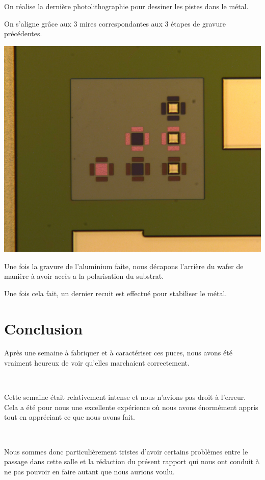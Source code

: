 \documentclass{article}
\begin{document}
On réalise la dernière photolithographie pour dessiner les pistes dans le métal.

On s’aligne grâce aux 3 mires correspondantes aux 3 étapes de gravure précédentes.

\includegraphics[width=\linewidth]{mire_alu_grave.png}

Une fois la gravure de l’aluminium faite, nous décapons l’arrière du wafer de manière à avoir accès a la polarisation du substrat.

Une fois cela fait, un dernier recuit est effectué pour stabiliser le métal.

\section*{Conclusion}

Après une semaine à fabriquer et à caractériser ces puces, nous avons été vraiment heureux de voir qu’elles marchaient correctement.

~

Cette semaine était relativement intense et nous n’avions pas droit à l’erreur. Cela a été pour nous une excellente expérience où nous avons énormément appris tout en appréciant ce que nous avons fait.

~

Nous sommes donc particulièrement tristes d’avoir certains problèmes entre le passage dans cette salle et la rédaction du présent rapport qui nous ont conduit à ne pas pouvoir en faire autant que nous aurions voulu.
\end{document}
